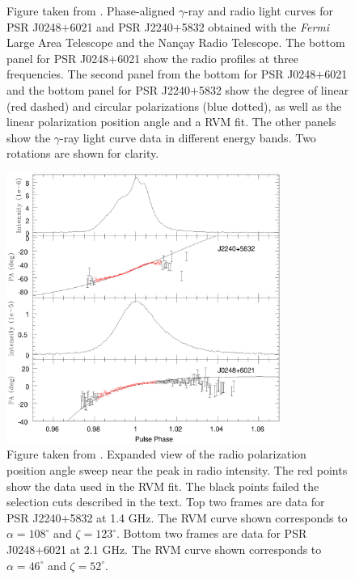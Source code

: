 \begin{figure}[t!!]
\caption[Phase-aligned $\gamma$-ray and radio light curves for PSR J0248$+$6021 and PSR J2240$+$5832 obtained with
the \emph{Fermi} Large Area Telescope and the Nan\c cay Radio Telescope]{
Figure taken from \cite{theureau2011psrs}.
Phase-aligned $\gamma$-ray and radio light curves for PSR J0248$+$6021 and PSR J2240$+$5832 obtained with 
the \emph{Fermi} Large Area Telescope and the Nan\c cay Radio Telescope. 
The bottom panel for PSR J0248$+$6021 show the radio profiles at three frequencies. 
The second panel from the bottom
for PSR J0248$+$6021 and the bottom panel for PSR J2240$+$5832 
show the degree of linear (red dashed) and circular
polarizations (blue dotted), as well as the linear polarization position angle and a RVM fit.
The other panels show the
$\gamma$-ray light curve data in different energy bands. Two rotations are shown for clarity.}
\label{phasos}
\end{figure}

\begin{figure}[t!!]
\begin{center}
\includegraphics[width=0.8\textwidth]{chapters/multiWaveLength/figures/J0244Alpha46Zeta52Offset2.53133ANDJ2238Alpha108Zeta123Offsetneg45.818.ps}
\caption[Expanded view of the radio polarization position angle sweep near the peak in radio intensity]{Figure taken from \cite{theureau2011psrs}.
Expanded view of the radio polarization position angle sweep near the peak in radio intensity. 
The red points show the data used in the RVM fit. The black points failed the selection cuts
described in the text. Top two frames are data for PSR J2240$+$5832 at 1.4 GHz. The RVM curve shown corresponds to $\alpha = 108^\circ$ and $\zeta = 123^\circ$. Bottom two frames are data for PSR J0248+6021
at 2.1 GHz. The RVM curve shown corresponds to $\alpha = 46^\circ$ and $\zeta =52^\circ$.  \label{PolarZoom}
}
\end{center}
\end{figure}

